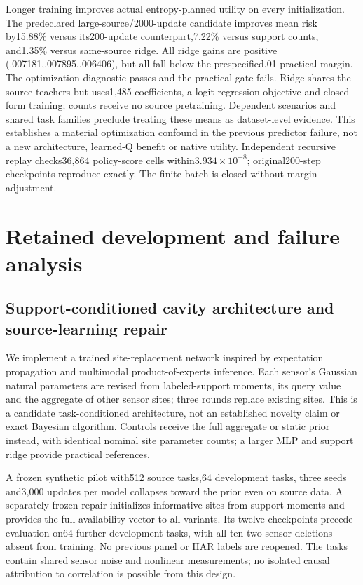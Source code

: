 \documentclass[10pt]{article}
\begin{document}
Longer training improves actual entropy-planned utility on every initialization. The predeclared large-source/2000-update candidate improves mean risk by15.88\% versus its200-update counterpart,7.22\% versus support counts, and1.35\% versus same-source ridge. All ridge gains are positive (.007181,.007895,.006406), but all fall below the prespecified.01 practical margin. The optimization diagnostic passes and the practical gate fails. Ridge shares the source teachers but uses1,485 coefficients, a logit-regression objective and closed-form training; counts receive no source pretraining. Dependent scenarios and shared task families preclude treating these means as dataset-level evidence. This establishes a material optimization confound in the previous predictor failure, not a new architecture, learned-Q benefit or native utility. Independent recursive replay checks36,864 policy-score cells within$3.934\times10^{-8}$; original200-step checkpoints reproduce exactly. The finite batch is closed without margin adjustment.

\appendix
\section{Retained development and failure analysis}

\subsection{Support-conditioned cavity architecture and source-learning repair}
We implement a trained site-replacement network inspired by expectation propagation\cite{minkaep} and multimodal product-of-experts inference\cite{wumvae}. Each sensor's Gaussian natural parameters are revised from labeled-support moments, its query value and the aggregate of other sensor sites; three rounds replace existing sites. This is a candidate task-conditioned architecture, not an established novelty claim or exact Bayesian algorithm. Controls receive the full aggregate or static prior instead, with identical nominal site parameter counts; a larger MLP and support ridge provide practical references.

A frozen synthetic pilot with512 source tasks,64 development tasks, three seeds and3,000 updates per model collapses toward the prior even on source data. A separately frozen repair initializes informative sites from support moments and provides the full availability vector to all variants. Its twelve checkpoints precede evaluation on64 further development tasks, with all ten two-sensor deletions absent from training. No previous panel or HAR labels are reopened. The tasks contain shared sensor noise and nonlinear measurements; no isolated causal attribution to correlation is possible from this design.
\end{document}
